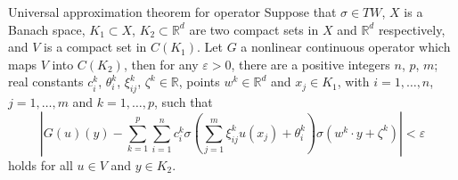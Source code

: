 \documentclass{beamer}
\newcommand{\numberset}{\mathbb}
\newcommand{\R}{\numberset{R}}
\begin{document}

\begin{frame}[noframenumbering]{Universal approximation theorem for operator}
	Suppose that $ \sigma \in TW $, $ X $ is a Banach space, $ K_1 \subset X $, $ K_2 \subset \R^d $ are two compact sets in $ X $ and $ \R^{d} $ respectively, and $ V $ is a compact set in $ C(K_1) $. Let $ G $ a nonlinear continuous operator which maps $ V $ into $ C(K_2) $, then for any $ \varepsilon > 0 $, there are a positive integers $ n $, $ p $, $ m $; real constants $ c_i^{k}$, $ \theta_i^{k}$, $ \xi_{ij}^{k} $, $ \zeta^k \in \R $, points $ w^{k} \in \R^d $ and $ x_j \in K_1 $, with $ i = 1, \dots, n$, $ j = 1, \dots, m $ and $ k = 1, \dots, p $, such that
	\[ \left| G(u)(y) - \sum_{k=1}^{p}\sum_{i=1}^{n}c_i^k \sigma \left( \sum_{j=1}^{m} \xi_{ij}^k u(x_j) + \theta_i^k \right) \sigma(w^k \cdot y + \zeta^k) \right| < \varepsilon  \]
	holds for all $ u \in V $ and $ y \in K_2 $.
\end{frame}
\end{document}
